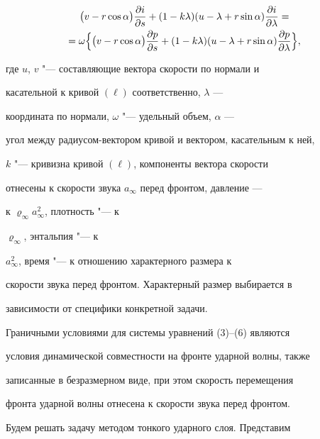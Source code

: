 \begin{multline}


\bigl(v - r\cos\alpha\bigr) \frac{\partial i}{\partial


s} + (1-k\lambda) (u -


\lambda + r\sin\alpha) \frac{\partial i}{\partial \lambda} =\\


=\omega \Bigl\{\bigl(v - r\cos\alpha\bigr) \frac{\partial


p}{\partial s} +


 (1-k\lambda) (u - \lambda + r \sin\alpha)  \frac


{\partial p}{\partial \lambda} \Bigr\},


\end{multline}


где $u$,  $v$ "--- составляющие вектора скорости по нормали и


касательной к кривой $(\ell)$ соответственно,  $\lambda$ ---


координата по нормали,  $\omega$ "--- удельный объем,  $\alpha$ ---


угол между радиусом-вектором кривой и вектором,  касательным к ней,


$k$ "--- кривизна кривой $(\ell)$,  компоненты вектора скорости


отнесены к скорости звука  $a_\infty$ перед фронтом,  давление ---


к ${\varrho_\infty} {a^2_\infty}$,  плотность "--- к


$\varrho_\infty$,  энтальпия "--- к


 $a^2_\infty$,  время "--- к отношению характерного размера к


 скорости звука перед фронтом. Характерный размер выбирается в


 зависимости от специфики конкретной задачи.





Граничными условиями для системы уравнений (3)--(6) являются


условия динамической совместности на фронте ударной волны,  также


записанные в безразмерном виде,  при этом скорость перемещения


фронта ударной волны отнесена к скорости звука перед фронтом.





Будем решать задачу методом тонкого ударного слоя.  Представим


